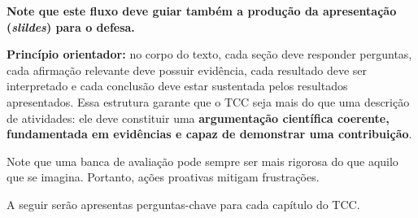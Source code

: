 \textbf{
Note que este fluxo deve guiar também a produção da  apresentação (\textit{slildes}) para o defesa.
}

\textbf{Princípio orientador:} no corpo do texto, cada seção deve responder perguntas, cada afirmação relevante deve possuir
evidência, cada resultado deve ser interpretado e cada conclusão deve estar
sustentada pelos resultados apresentados. Essa estrutura garante que o TCC seja mais do que uma descrição de atividades:
ele deve constituir uma \textbf{argumentação científica coerente, fundamentada
	em evidências e capaz de demonstrar uma contribuição}.

Note que uma banca de avaliação pode sempre ser mais rigorosa do que aquilo que se imagina. Portanto, ações proativas mitigam frustrações.

A seguir serão apresentas perguntas-chave para cada capítulo do TCC.

